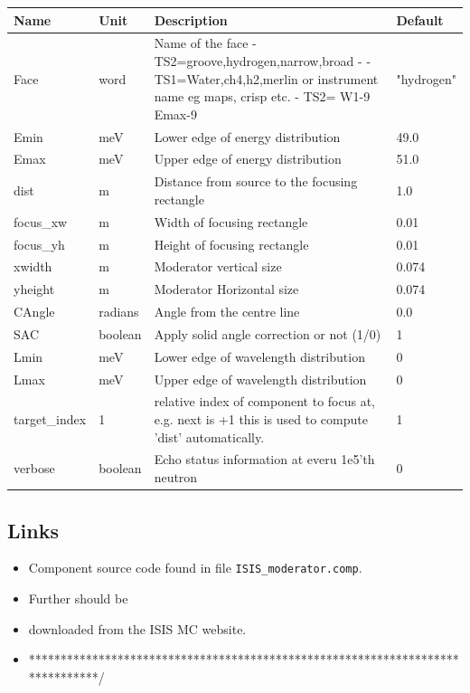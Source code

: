 \begin{longtable}{p{}p{}p{}p{}}
\toprule
\textbf{Name} & \textbf{Unit} & \textbf{Description} & \textbf{Default} \\
\midrule
\endhead
Face & word & Name of the face - TS2=groove,hydrogen,narrow,broad - - TS1=Water,ch4,h2,merlin or instrument name eg maps, crisp etc. - TS2= W1-9 Emax-9 & "hydrogen" \\
Emin & meV & Lower edge of energy distribution & 49.0 \\
Emax & meV & Upper edge of energy distribution & 51.0 \\
dist & m & Distance from source to the focusing rectangle & 1.0 \\
focus\_xw & m & Width of focusing rectangle & 0.01 \\
focus\_yh & m & Height of focusing rectangle & 0.01 \\
xwidth & m & Moderator vertical size & 0.074 \\
yheight & m & Moderator Horizontal size & 0.074 \\
CAngle & radians & Angle from the centre line & 0.0 \\
SAC & boolean & Apply solid angle correction or not (1/0) & 1 \\
Lmin & meV & Lower edge of wavelength distribution & 0 \\
Lmax & meV & Upper edge of wavelength distribution & 0 \\
target\_index & 1 & relative index of component to focus at, e.g. next is +1 this is used to compute 'dist' automatically. & 1 \\
verbose & boolean & Echo status information at everu 1e5'th neutron & 0 \\
\bottomrule
\end{longtable}

\subsection*{Links}
\begin{itemize}
  \item Component source code found in file \texttt{ISIS\_moderator.comp}.
  \item Further  should be
  \item downloaded from the ISIS MC website.
  \item *******************************************************************************/
\end{itemize}
